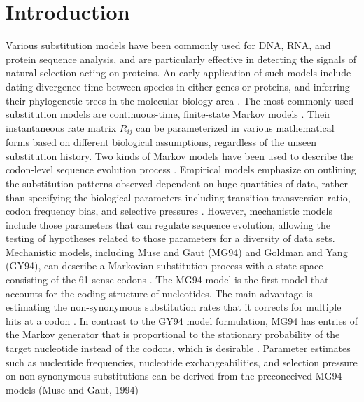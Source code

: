 \section{Introduction}
Various substitution models have been commonly used for DNA, RNA, and protein sequence analysis, and are particularly effective in detecting the signals of natural selection acting on proteins. An early application of such models include dating divergence time between species in either genes or proteins, and inferring their phylogenetic trees in the molecular biology area \parencite{felsenstein1981evolutionary}. The most commonly used substitution models are continuous-time, finite-state Markov models \parencite{karlin2014first}. Their instantaneous rate matrix $R_{ij}$ can be parameterized in various mathematical forms based on different biological assumptions, regardless of the unseen substitution history. Two kinds of Markov models have been used to describe the codon-level sequence evolution process \parencite{kosiol2007empirical}. Empirical models emphasize on outlining the substitution patterns observed dependent on huge quantities of data, rather than specifying the biological parameters including transition-transversion ratio, codon frequency bias, and selective pressures \parencite{lio1998models}. However, mechanistic models include those parameters that can regulate sequence evolution, allowing the testing of hypotheses related to those parameters for a diversity of data sets.\\
\indent Mechanistic models, including Muse and Gaut (MG94) and Goldman and Yang (GY94),  can describe a Markovian substitution process with a state space consisting of the 61 sense codons \parencite{suchard2001bayesian}. The MG94 model is the first model that accounts for the coding structure of nucleotides. The main advantage is estimating the non-synonymous substitution rates that it corrects for multiple hits at a codon \parencite{muse1994likelihood}. In contrast to the GY94 model formulation, MG94 has entries of the Markov generator that is proportional to the stationary probability of the target nucleotide instead of the codons, which is desirable \parencite{huelsenbeck2004bayesian}. Parameter estimates such as nucleotide frequencies, nucleotide exchangeabilities, and selection pressure on non-synonymous substitutions can be derived from the preconceived MG94 models (Muse and Gaut, 1994)\\
